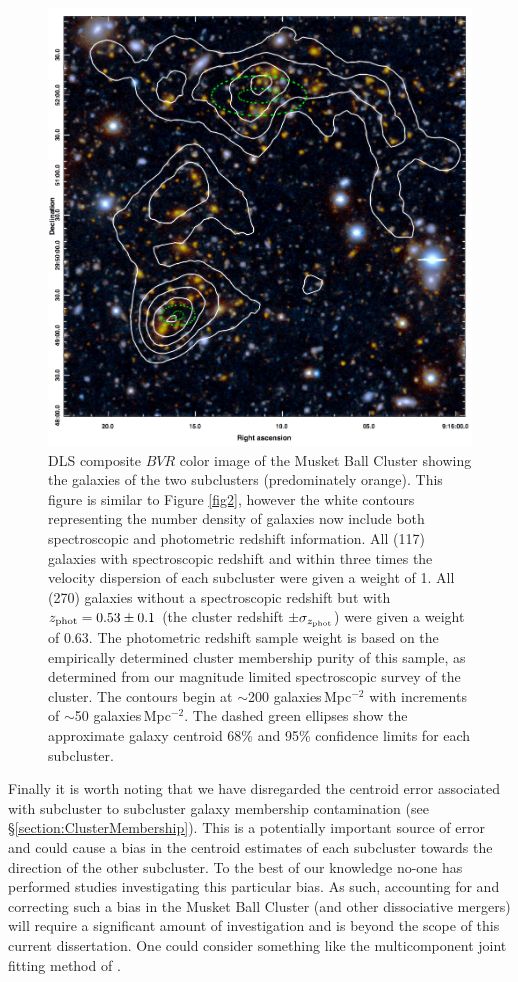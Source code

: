\begin{figure}
\centering
\includegraphics[width=5in]{Chapter4/DLScolor_wGalDenCon.png}
\caption[Musket Ball Cluster galaxy number density map including spectroscopic redshift information.]{
DLS composite $BVR$ color image of the Musket Ball Cluster showing  the galaxies of the two subclusters (predominately orange). 
This figure is similar to Figure \ref{fig2}, however the white contours representing the number density of galaxies now include both spectroscopic and photometric redshift information.
All (117) galaxies with spectroscopic redshift and within three times the velocity dispersion of each subcluster were given a weight of 1.
All (270) galaxies without a spectroscopic redshift but with $z_{\rm phot}=0.53\pm0.1$ (the cluster redshift $\pm\sigma_{z_{\rm phot}}$) were given a weight of 0.63.
The photometric redshift sample weight is based on the empirically determined cluster membership purity of this sample, as determined from our magnitude limited spectroscopic survey of the cluster.
The contours begin at $\sim$200 galaxies\,Mpc$^{-2}$ with increments of $\sim$50 galaxies\,Mpc$^{-2}$.
The dashed green ellipses show the approximate galaxy centroid 68\% and 95\% confidence limits for each subcluster.
}
\label{figure:GalDenMap_withspec}
\end{figure}

Finally it is worth noting that  we have disregarded the centroid error associated with subcluster to subcluster galaxy membership contamination (see \S\ref{section:ClusterMembership}).
This is a potentially important source of error and could cause a bias in the centroid estimates of each subcluster towards the direction of the other subcluster.
To the best of our knowledge no-one has performed studies investigating this particular bias. 
As such, accounting for and correcting such a bias in the Musket Ball Cluster (and other dissociative mergers) will require a significant amount of investigation and is beyond the scope of this current dissertation.
One could consider something like the multicomponent joint fitting method of \citet{Walker:2011eg}.


